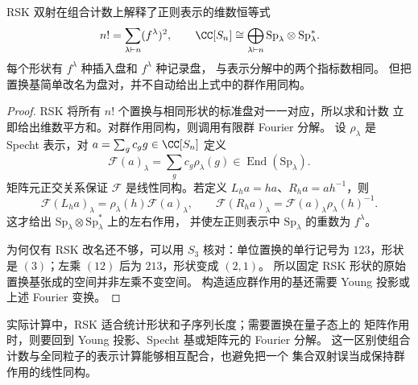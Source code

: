 \begin{proposition}
\label{prop:rsk-regular}
RSK 双射在组合计数上解释了正则表示的维数恒等式
\[
n!=\sum_{\lambda\vdash n}(f^\lambda)^2,
\qquad
\CC[S_n]\cong\bigoplus_{\lambda\vdash n}
\mathrm{Sp}_\lambda\otimes\mathrm{Sp}_\lambda^*.
\]
每个形状有 $f^\lambda$ 种插入盘和 $f^\lambda$ 种记录盘，
与表示分解中的两个指标数相同。
但把置换基简单改名为盘对，并不自动给出上式中的群作用同构。
\end{proposition}

\begin{proof}
RSK 将所有 $n!$ 个置换与相同形状的标准盘对一一对应，所以求和计数
立即给出维数平方和。对群作用同构，则调用有限群 Fourier 分解。
设 $\rho_\lambda$ 是 Specht 表示，对 $a=\sum_g c_g g\in\CC[S_n]$ 定义
\[
\mathcal F(a)_\lambda=\sum_g c_g\rho_\lambda(g)
\in\operatorname{End}(\mathrm{Sp}_\lambda).
\]
矩阵元正交关系保证 $\mathcal F$ 是线性同构。若定义
$L_h a=ha$、$R_h a=ah^{-1}$，则
\[
\mathcal F(L_h a)_\lambda=\rho_\lambda(h)\mathcal F(a)_\lambda,
\qquad
\mathcal F(R_h a)_\lambda=\mathcal F(a)_\lambda\rho_\lambda(h)^{-1}.
\]
这才给出 $\mathrm{Sp}_\lambda\otimes\mathrm{Sp}_\lambda^*$ 上的左右作用，
并使左正则表示中 $\mathrm{Sp}_\lambda$ 的重数为 $f^\lambda$。

为何仅有 RSK 改名还不够，可以用 $S_3$ 核对：单位置换的单行记号为
$123$，形状是 $(3)$；左乘 $(12)$ 后为 $213$，形状变成 $(2,1)$。
所以固定 RSK 形状的原始置换基张成的空间并非左乘不变空间。
构造适应群作用的基还需要 Young 投影或上述 Fourier 变换。
\end{proof}

实际计算中，RSK 适合统计形状和子序列长度；需要置换在量子态上的
矩阵作用时，则要回到 Young 投影、Specht 基或矩阵元的 Fourier 分解。
这一区别使组合计数与全同粒子的表示计算能够相互配合，也避免把一个
集合双射误当成保持群作用的线性同构。
